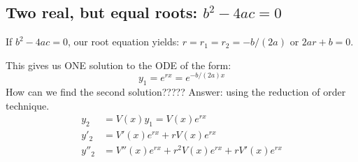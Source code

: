 %
%
%
%
%


\subsection{Two real, but equal roots: $b^2-4ac=0$}
If  $b^2-4ac=0$, our root equation yields: $r=r_1=r_2=-b/(2a)$ or $2ar+b=0$.

This gives us ONE solution to the ODE of the form:
\begin{equation*}
y_1=e^{rx}=e^{-b/(2a) x}
\end{equation*}
How can we find the second solution?????
Answer: using the reduction of order technique.
\begin{align*}
y_2&=V(x)y_1=V(x)e^{r x}\\
y'_2&=V'(x)e^{r x}+rV(x)e^{rx}\\
y''_2&=V''(x)e^{r x}+r^2V(x)e^{rx}+rV'(x)e^{rx}\\
\end{align*}

